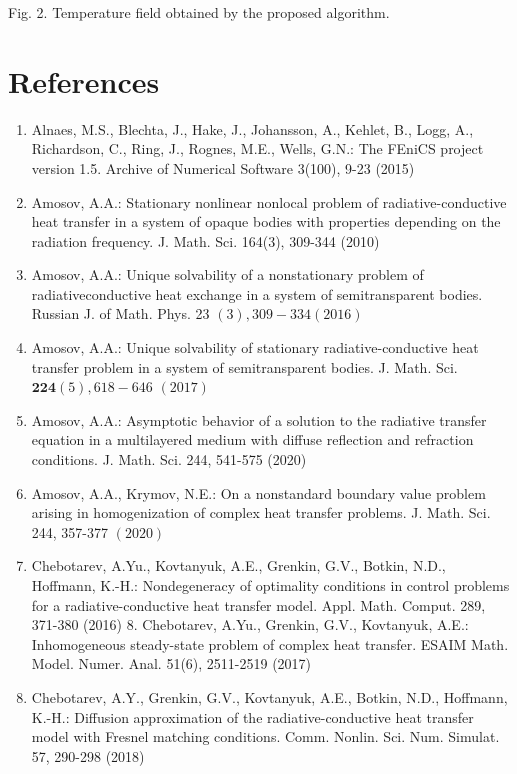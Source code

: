 \documentclass[10pt]{article}
\begin{document}
Fig. 2. Temperature field obtained by the proposed algorithm.

\section{References}
\begin{enumerate}
  \item Alnaes, M.S., Blechta, J., Hake, J., Johansson, A., Kehlet, B., Logg, A., Richardson, C., Ring, J., Rognes, M.E., Wells, G.N.: The FEniCS project version 1.5. Archive of Numerical Software 3(100), 9-23 (2015)

  \item Amosov, A.A.: Stationary nonlinear nonlocal problem of radiative-conductive heat transfer in a system of opaque bodies with properties depending on the radiation frequency. J. Math. Sci. 164(3), 309-344 (2010)

  \item Amosov, A.A.: Unique solvability of a nonstationary problem of radiativeconductive heat exchange in a system of semitransparent bodies. Russian J. of Math. Phys. 23 $(3), 309-334(2016)$

  \item Amosov, A.A.: Unique solvability of stationary radiative-conductive heat transfer problem in a system of semitransparent bodies. J. Math. Sci. $\mathbf{2 2 4}(5), 618-646$ $(2017)$

  \item Amosov, A.A.: Asymptotic behavior of a solution to the radiative transfer equation in a multilayered medium with diffuse reflection and refraction conditions. J. Math. Sci. 244, 541-575 (2020)

  \item Amosov, A.A., Krymov, N.E.: On a nonstandard boundary value problem arising in homogenization of complex heat transfer problems. J. Math. Sci. 244, 357-377 $(2020)$

  \item Chebotarev, A.Yu., Kovtanyuk, A.E., Grenkin, G.V., Botkin, N.D., Hoffmann, K.-H.: Nondegeneracy of optimality conditions in control problems for a radiative-conductive heat transfer model. Appl. Math. Comput. 289, 371-380 (2016) 8. Chebotarev, A.Yu., Grenkin, G.V., Kovtanyuk, A.E.: Inhomogeneous steady-state problem of complex heat transfer. ESAIM Math. Model. Numer. Anal. 51(6), 2511-2519 (2017)

  \item Chebotarev, A.Y., Grenkin, G.V., Kovtanyuk, A.E., Botkin, N.D., Hoffmann, K.-H.: Diffusion approximation of the radiative-conductive heat transfer model with Fresnel matching conditions. Comm. Nonlin. Sci. Num. Simulat. 57, 290-298 (2018)


\end{enumerate}
\end{document}
